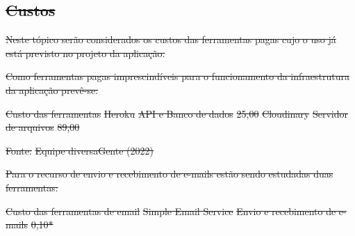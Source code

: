 \documentclass[
    12pt,               %
    openright,          %
    oneside,
    a4paper,            %
    paginasA3,  %
    BIBLATEX,           %
    REFINDENT,          %
    MODELO,             %
    TODO,               %
    english,            %
    brazil              %
    ]{ifsp-spo-inf-ctds} %
\providecommand{\DIFdel}[1]{{\protect\color{red}\sout{#1}}}                      %
\begin{document}
\begin{apendicesenv}
\section{\DIFdel{Custos}}
\addtocounter{section}{-1}%
\DIFdel{Neste tópico serão considerados os custos das ferramentas pagas cujo o uso já está previsto no projeto da aplicação. 
}%

\DIFdel{Como ferramentas pagas imprescindíveis para o funcionamento da infraestrutura da aplicação prevê-se:
}%

{%
\DIFdel{Custo das ferramentas}}
\DIFdel{Heroku }%
\DIFdel{API e Banco de dados  }%
\DIFdel{25,00  }%
\DIFdel{Cloudinary }%
\DIFdel{Servidor de arquivos }%
\DIFdel{89,00 }%

\DIFdel{Fonte:}%
\DIFdel{Equipe diversaGente (2022) }%

\DIFdel{Para o recurso de envio e recebimento de e-mails estão sendo estudadas duas ferramentas: 
}%

{%
\DIFdel{Custo das ferramentas de email}}
\DIFdel{Simple Email Service }%
\DIFdel{Envio e recebimento de e-mails }%
\DIFdel{0,10*}%


\end{apendicesenv}
\end{document}
